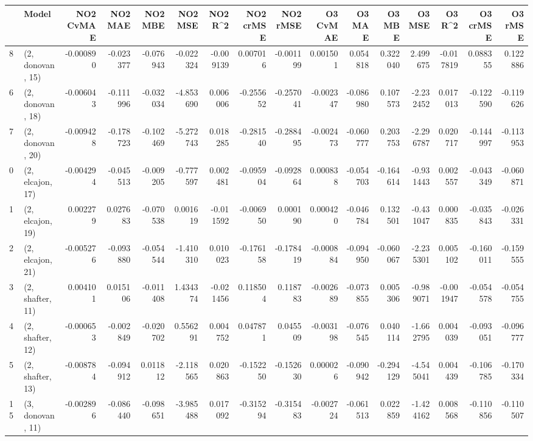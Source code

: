 \begin{tabular}{llrrrrrrrrrrrrrr}
\toprule
{} &             Model &  NO2 CvMAE &   NO2 MAE &   NO2 MBE &    NO2 MSE &   NO2 R\textasciicircum2 &  NO2 crMSE &  NO2 rMSE &  O3 CvMAE &    O3 MAE &    O3 MBE &     O3 MSE &    O3 R\textasciicircum2 &  O3 crMSE &   O3 rMSE \\
\midrule
8  &  (2, donovan, 15) &  -0.000890 & -0.023377 & -0.076943 &  -0.022324 & -0.009139 &   0.007016 & -0.001199 &  0.001501 &  0.054818 &  0.322040 &   2.499675 & -0.017819 &  0.088355 &  0.122886 \\
6  &  (2, donovan, 18) &  -0.006043 & -0.111996 & -0.032034 &  -4.853690 &  0.006006 &  -0.255652 & -0.257041 & -0.002347 & -0.086980 &  0.107573 &  -2.232452 &  0.017013 & -0.122590 & -0.119626 \\
7  &  (2, donovan, 20) &  -0.009428 & -0.178723 & -0.102469 &  -5.272743 &  0.018285 &  -0.281540 & -0.288495 & -0.002473 & -0.060777 &  0.203753 &  -2.296787 &  0.020717 & -0.144997 & -0.113953 \\
0  &  (2, elcajon, 17) &  -0.004294 & -0.045513 & -0.009205 &  -0.777597 &  0.002481 &  -0.095904 & -0.092864 &  0.000838 & -0.054703 & -0.164614 &  -0.931443 &  0.002557 & -0.043349 & -0.060871 \\
1  &  (2, elcajon, 19) &   0.002279 &  0.027683 & -0.070538 &   0.001619 & -0.011592 &  -0.006950 &  0.000190 &  0.000420 & -0.046784 &  0.132501 &  -0.431047 &  0.000835 & -0.035843 & -0.026331 \\
2  &  (2, elcajon, 21) &  -0.005276 & -0.093880 & -0.054544 &  -1.410310 &  0.010023 &  -0.176158 & -0.178419 & -0.000884 & -0.094950 & -0.060067 &  -2.235301 &  0.005102 & -0.160011 & -0.159555 \\
3  &  (2, shafter, 11) &   0.004101 &  0.015106 & -0.011408 &   1.434374 & -0.021456 &   0.118504 &  0.118783 & -0.002689 & -0.073855 &  0.005306 &  -0.989071 & -0.001947 & -0.054578 & -0.054755 \\
4  &  (2, shafter, 12) &  -0.000653 & -0.002849 & -0.020702 &   0.556291 &  0.004752 &   0.047871 &  0.045509 & -0.003198 & -0.076545 &  0.040114 &  -1.662795 &  0.004039 & -0.093051 & -0.096777 \\
5  &  (2, shafter, 13) &  -0.008784 & -0.094912 &  0.011812 &  -2.118565 &  0.020863 &  -0.152250 & -0.152630 &  0.000026 & -0.090942 & -0.294129 &  -4.545041 &  0.004439 & -0.106785 & -0.170334 \\
15 &  (3, donovan, 11) &  -0.002896 & -0.086440 & -0.098651 &  -3.985488 &  0.017092 &  -0.315294 & -0.315483 & -0.002724 & -0.061513 &  0.022859 &  -1.424162 &  0.008568 & -0.110856 & -0.110507 \\

\end{tabular}
